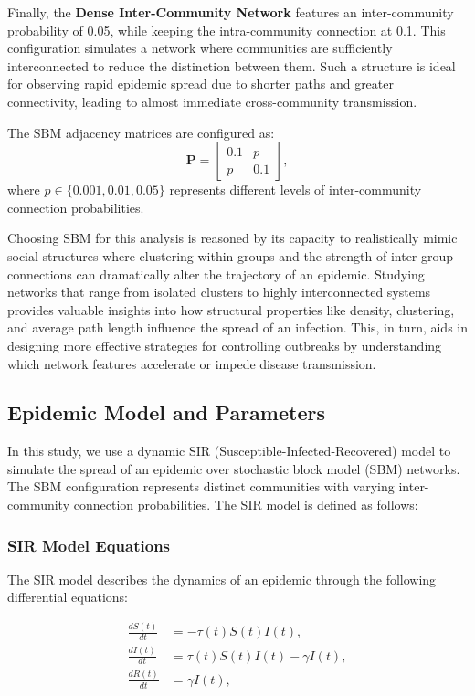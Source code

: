 \documentclass[12pt,a4paper]{article}
\begin{document}
Finally, the \textbf{Dense Inter-Community Network} features an inter-community probability of 0.05, while keeping the intra-community connection at 0.1. This configuration simulates a network where communities are sufficiently interconnected to reduce the distinction between them. Such a structure is ideal for observing rapid epidemic spread due to shorter paths and greater connectivity, leading to almost immediate cross-community transmission.

The SBM adjacency matrices are configured as:
\[
\mathbf{P} =
\begin{bmatrix}
0.1 & p \\
p & 0.1
\end{bmatrix},
\]
where \(p \in \{0.001, 0.01, 0.05\}\) represents different levels of inter-community connection probabilities.

Choosing SBM for this analysis is reasoned by its capacity to realistically mimic social structures where clustering within groups and the strength of inter-group connections can dramatically alter the trajectory of an epidemic. Studying networks that range from isolated clusters to highly interconnected systems provides valuable insights into how structural properties like density, clustering, and average path length influence the spread of an infection. This, in turn, aids in designing more effective strategies for controlling outbreaks by understanding which network features accelerate or impede disease transmission.





\subsection{Epidemic Model and Parameters}

In this study, we use a dynamic SIR (Susceptible-Infected-Recovered) model to simulate the spread of an epidemic over stochastic block model (SBM) networks. The SBM configuration represents distinct communities with varying inter-community connection probabilities. The SIR model is defined as follows:

\subsubsection*{SIR Model Equations}
The SIR model describes the dynamics of an epidemic through the following differential equations:

\begin{align}
    \frac{dS(t)}{dt} &= -\tau(t) S(t) I(t), \\
    \frac{dI(t)}{dt} &= \tau(t) S(t) I(t) - \gamma I(t), \\
    \frac{dR(t)}{dt} &= \gamma I(t),
\end{align}
\end{document}

